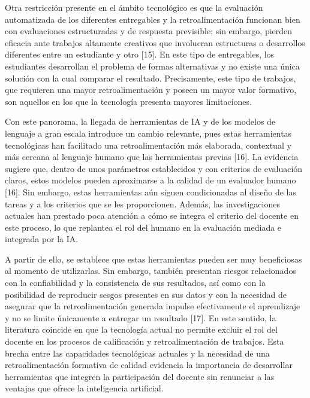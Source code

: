 \documentclass[letterpaper, 10 pt, conference]{ieeeconf}  %
\begin{document}
    Otra restricción presente en el ámbito tecnológico es que la evaluación automatizada de los diferentes entregables y la retroalimentación funcionan bien con evaluaciones estructuradas y de respuesta previsible; sin embargo, pierden eficacia ante trabajos altamente creativos que involucran estructuras o desarrollos diferentes entre un estudiante y otro [15]. En este tipo de entregables, los estudiantes desarrollan el problema de formas alternativas y no existe una única solución con la cual comparar el resultado. Precisamente, este tipo de trabajos, que requieren una mayor retroalimentación y poseen un mayor valor formativo, son aquellos en los que la tecnología presenta mayores limitaciones.

    Con este panorama, la llegada de herramientas de IA y de los modelos de lenguaje a gran escala introduce un cambio relevante, pues estas herramientas tecnológicas han facilitado una retroalimentación más elaborada, contextual y más cercana al lenguaje humano que las herramientas previas [16]. La evidencia sugiere que, dentro de unos parámetros establecidos y con criterios de evaluación claros, estos modelos pueden aproximarse a la calidad de un evaluador humano [16]. Sin embargo, estas herramientas aún siguen condicionadas al diseño de las tareas y a los criterios que se les proporcionen. Además, las investigaciones actuales han prestado poca atención a cómo se integra el criterio del docente en este proceso, lo que replantea el rol del humano en la evaluación mediada e integrada por la IA.

    A partir de ello, se establece que estas herramientas pueden ser muy beneficiosas al momento de utilizarlas. Sin embargo, también presentan riesgos relacionados con la confiabilidad y la consistencia de sus resultados, así como con la posibilidad de reproducir sesgos presentes en sus datos y con la necesidad de asegurar que la retroalimentación generada impulse efectivamente el aprendizaje y no se limite únicamente a entregar un resultado [17]. En este sentido, la literatura coincide en que la tecnología actual no permite excluir el rol del docente en los procesos de calificación y retroalimentación de trabajos. Esta brecha entre las capacidades tecnológicas actuales y la necesidad de una retroalimentación formativa de calidad evidencia la importancia de desarrollar herramientas que integren la participación del docente sin renunciar a las ventajas que ofrece la inteligencia artificial.
\end{document}

